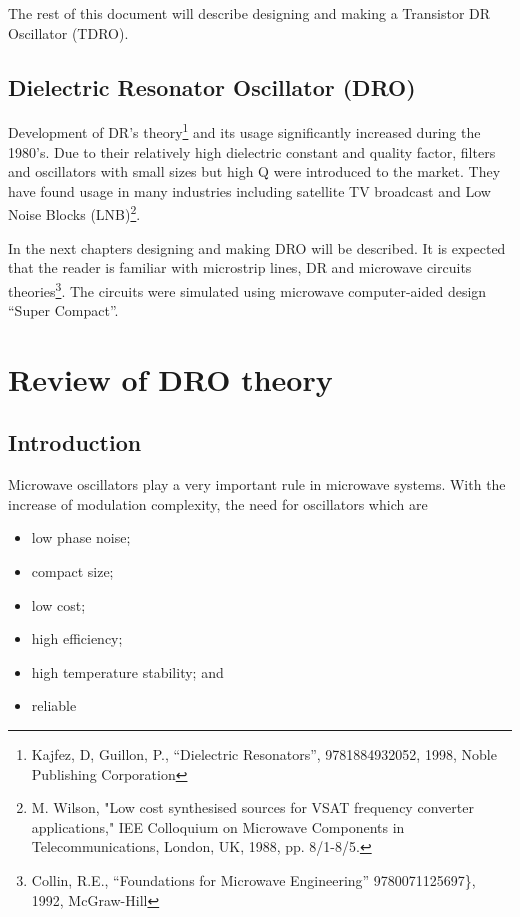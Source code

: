 The rest of this document will describe designing and making a
Transistor DR Oscillator (TDRO).

\hypertarget{dielectric-resonator-oscillator-dro}{%
\subsection{Dielectric Resonator Oscillator
(DRO)}\label{dielectric-resonator-oscillator-dro}}

Development of DR's theory\footnote{Kajfez, D, Guillon, P., ``Dielectric
  Resonators'', 9781884932052, 1998, Noble Publishing Corporation} and
its usage significantly increased during the 1980's. Due to their
relatively high dielectric constant and quality factor, filters and
oscillators with small sizes but high Q were introduced to the market.
They have found usage in many industries including satellite TV
broadcast and Low Noise Blocks (LNB)\footnote{M. Wilson, "Low cost
  synthesised sources for VSAT frequency converter applications," IEE
  Colloquium on Microwave Components in Telecommunications, London, UK,
  1988, pp. 8/1-8/5.}.

In the next chapters designing and making DRO will be described. It is
expected that the reader is familiar with microstrip lines, DR and
microwave circuits theories\footnote{Collin, R.E., ``Foundations for
  Microwave Engineering'' 9780071125697\}, 1992, McGraw-Hill}. The
circuits were simulated using microwave computer-aided design ``Super
Compact''.

\hypertarget{review-of-dro-theory}{%
\section{Review of DRO theory}\label{review-of-dro-theory}}

\hypertarget{introduction}{%
\subsection{Introduction}\label{introduction}}

Microwave oscillators play a very important rule in microwave systems.
With the increase of modulation complexity, the need for oscillators
which are

\begin{itemize}
\item
  low phase noise;
\item
  compact size;
\item
  low cost;
\item
  high efficiency;
\item
  high temperature stability; and
\item
  reliable
\end{itemize}


